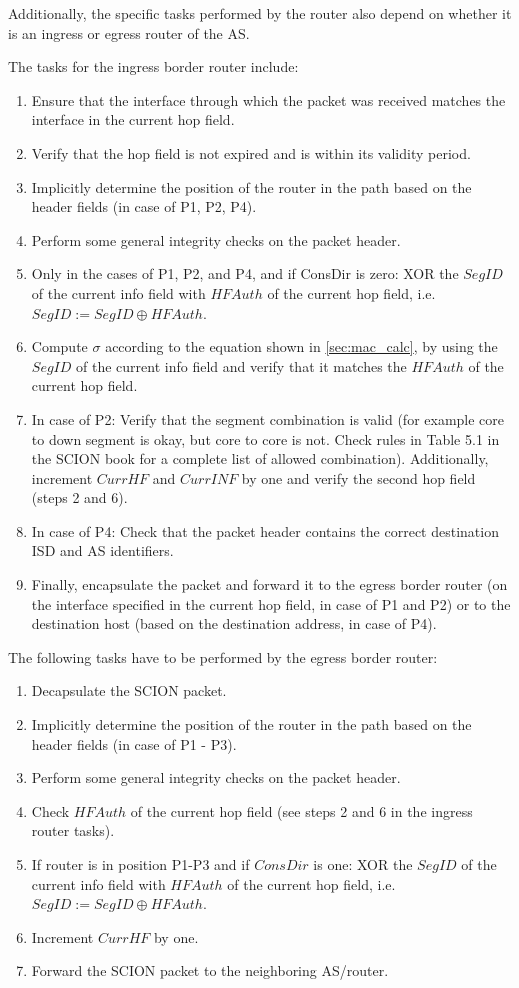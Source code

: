 Additionally, the specific tasks performed by the router also depend on whether it is an ingress or egress router of the AS.

The tasks for the ingress border router include:
\begin{enumerate}
    \item Ensure that the interface through which the packet was received matches the interface in the current hop field.
    \item Verify that the hop field is not expired and is within its validity period.
    \item Implicitly determine the position of the router in the path based on the header fields (in case of P1, P2, P4).
    \item Perform some general integrity checks on the packet header.
    \item Only in the cases of P1, P2, and P4, and if ConsDir is zero: XOR the $SegID$ of the current info field with $HFAuth$ of the current hop field, i.e. $SegID := SegID \oplus HFAuth$.
    \item Compute $\sigma$ according to the equation shown in \cref{sec:mac_calc}, by using the $SegID$ of the current info field and verify that it matches the $HFAuth$ of the current hop field.
    \item In case of P2: Verify that the segment combination is valid (for example core to down segment is okay, but core to core is not. Check rules in Table 5.1 in the SCION book \cite{Perrig2022} for a complete list of allowed combination).
    Additionally, increment $CurrHF$ and $CurrINF$ by one and verify the second hop field (steps 2 and 6).
    \item In case of P4: Check that the packet header contains the correct destination ISD and AS identifiers.
    \item Finally, encapsulate the packet and forward it to the egress border router (on the interface specified in the current hop field, in case of P1 and P2) or to the destination host (based on the destination address, in case of P4).
\end{enumerate}


The following tasks have to be performed by the egress border router:
\begin{enumerate}
    \item Decapsulate the SCION packet.
    \item Implicitly determine the position of the router in the path based on the header fields (in case of P1 - P3).
    \item Perform some general integrity checks on the packet header.
    \item Check $HFAuth$ of the current hop field (see steps 2 and 6 in the ingress router tasks).
    \item If router is in position P1-P3 and if $ConsDir$ is one: XOR the $SegID$ of the current info field with $HFAuth$ of the current hop field, i.e. $SegID := SegID \oplus HFAuth$.
    \item Increment $CurrHF$ by one.
    \item Forward the SCION packet to the neighboring AS/router.
\end{enumerate}


